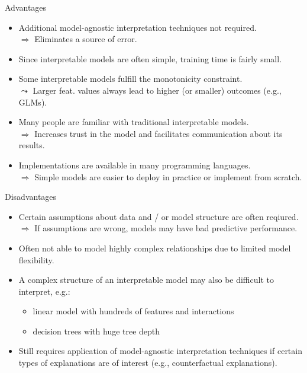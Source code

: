 \documentclass[11pt,compress,t,notes=noshow, aspectratio=169, xcolor=table]{beamer}
\begin{document}
\begin{frame}{Advantages}

    \begin{itemize}[<+->]
    \itemsep1em
        \item Additional model-agnostic interpretation techniques not required.\\
        $\Rightarrow$ Eliminates a source of error.
        \item Since interpretable models are often simple, training time is fairly small.
        \item Some interpretable models fulfill the monotonicity constraint.\\
        $\leadsto$ Larger feat. values always lead to higher (or smaller) outcomes (e.g., GLMs).
        \item Many people are familiar with traditional interpretable models.\\
        $\Rightarrow$ Increases trust in the model and facilitates communication about its results.
        \item Implementations are available in many programming languages. \\
        $\Rightarrow$ Simple models are easier to deploy in practice or implement from scratch.
    \end{itemize}

\end{frame}

\begin{frame}{Disadvantages}

    \begin{itemize}
    \itemsep1em
        \item Certain assumptions about data and / or model structure are often reqiured.\\
        $\Rightarrow$ If assumptions are wrong, models may have bad predictive performance.
        \pause
        \item Often not able to model highly complex relationships due to limited model flexibility.
        \pause
        \item A complex structure of an interpretable model may also be difficult to interpret, e.g.:
        \begin{itemize}
            \item linear model with hundreds of features and interactions 
            \item decision trees with huge tree depth
        \end{itemize}
        \pause
        \item Still requires application of model-agnostic interpretation techniques if certain types of explanations are of interest (e.g., counterfactual explanations).
    \end{itemize}

\end{frame}
\end{document}
